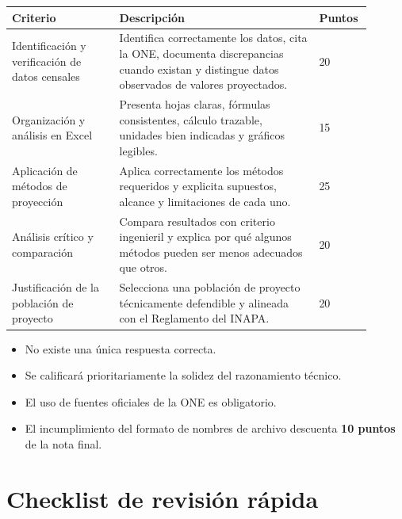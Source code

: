 \documentclass[11pt]{scrartcl}
\begin{document}
\begin{center}
\begin{tabular}{p{0.28\linewidth} p{0.52\linewidth} p{0.10\linewidth}}
  \toprule
  \textbf{Criterio} & \textbf{Descripción} & \textbf{Puntos} \\
  \midrule
  Identificación y verificación de datos censales &
    Identifica correctamente los datos, cita la ONE, documenta
    discrepancias cuando existan y distingue datos observados de
    valores proyectados. & 20 \\
  Organización y análisis en Excel &
    Presenta hojas claras, fórmulas consistentes, cálculo trazable,
    unidades bien indicadas y gráficos legibles. & 15 \\
  Aplicación de métodos de proyección &
    Aplica correctamente los métodos requeridos y explicita supuestos,
    alcance y limitaciones de cada uno. & 25 \\
  Análisis crítico y comparación &
    Compara resultados con criterio ingenieril y explica por qué
    algunos métodos pueden ser menos adecuados que otros. & 20 \\
  Justificación de la población de proyecto &
    Selecciona una población de proyecto técnicamente defendible y
    alineada con el Reglamento del INAPA. & 20 \\
  \bottomrule
\end{tabular}
\end{center}

\begin{icvwarning}
\begin{itemize}
  \item No existe una única respuesta correcta.
  \item Se calificará prioritariamente la solidez del razonamiento
    técnico.
  \item El uso de fuentes oficiales de la ONE es obligatorio.
  \item El incumplimiento del formato de nombres de archivo descuenta
    \textbf{10 puntos} de la nota final.
\end{itemize}
\end{icvwarning}

\section{Checklist de revisión rápida}
\end{document}
